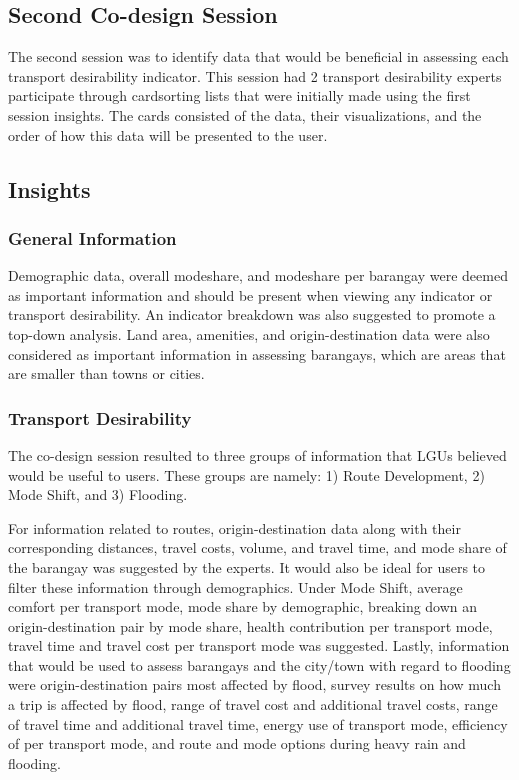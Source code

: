 \documentclass{sigchi}
\begin{document}
\subsection{Second Co-design Session}
The second session was to identify data that would be beneficial in assessing each transport desirability indicator. This session had 2 transport desirability experts participate through cardsorting lists that were initially made using the first session insights. The cards consisted of the data, their visualizations, and the order of how this data will be presented to the user.

\subsection{Insights}
\subsubsection{General Information}
Demographic data, overall modeshare, and modeshare per barangay were deemed as important information and should be present when viewing any indicator or transport desirability. An indicator breakdown was also suggested to promote a top-down analysis. Land area, amenities, and origin-destination data were also considered as important information in assessing barangays, which are areas that are smaller than towns or cities. 

\subsubsection{Transport Desirability}
The co-design session resulted to three groups of information that LGUs believed would be useful to users. These groups are namely: 1) Route Development, 2) Mode Shift, and 3) Flooding. 

For information related to routes, origin-destination data along with their corresponding distances, travel costs, volume, and travel time, and mode share of the barangay was suggested by the experts. It would also be ideal for users to filter these information through demographics. Under Mode Shift, average comfort per transport mode, mode share by demographic, breaking down an origin-destination pair by mode share, health contribution per transport mode, travel time and travel cost per transport mode was suggested. Lastly, information that would be used to assess barangays and the city/town with regard to flooding were origin-destination pairs most affected by flood, survey results on how much a trip is affected by flood, range of travel cost and additional travel costs, range of travel time and additional travel time, energy use of transport mode, efficiency of per transport mode, and route and mode options during heavy rain and flooding. 
\end{document}
